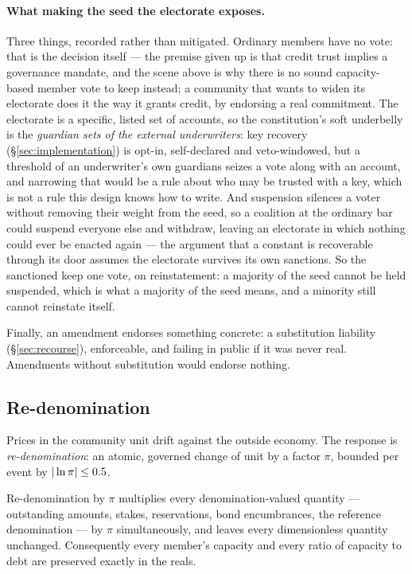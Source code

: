 \paragraph{What making the seed the electorate exposes.} Three things, recorded rather
than mitigated. Ordinary members have no vote: that is the decision itself --- the premise
given up is that credit trust implies a governance mandate, and the scene above is why
there is no sound capacity-based member vote to keep instead; a community that wants to
widen its electorate does it the way it grants credit, by endorsing a real commitment.
The electorate is a specific, listed set of accounts, so the constitution's soft underbelly
is the \emph{guardian sets of the external underwriters}: key recovery
(\S\ref{sec:implementation}) is opt-in, self-declared and veto-windowed, but a threshold
of an underwriter's own guardians seizes a vote along with an account, and narrowing that
would be a rule about who may be trusted with a key, which is not a rule this design knows
how to write. And suspension silences a voter without removing their weight from the
seed, so a coalition at the ordinary bar could suspend everyone else and withdraw, leaving
an electorate in which nothing could ever be enacted again --- the argument that a
constant is recoverable through its door assumes the electorate survives its own
sanctions. So the sanctioned keep one vote, on reinstatement: a majority of the seed cannot
be held suspended, which is what a majority of the seed means, and a minority still cannot
reinstate itself.

Finally, an amendment endorses something concrete: a substitution liability
(\S\ref{sec:recourse}), enforceable, and failing in public if it was never real.
Amendments without substitution would endorse nothing.

\subsection{Re-denomination}

Prices in the community unit drift against the outside economy. The response is
\emph{re-denomination}: an atomic, governed change of unit by a factor $\pi$, bounded per
event by $|\ln \pi| \le 0.5$.

\begin{theorem}
\label{thm:redenominate}
Re-denomination by $\pi$ multiplies every denomination-valued quantity --- outstanding
amounts, stakes, reservations, bond encumbrances, the reference denomination --- by $\pi$
simultaneously, and leaves every dimensionless quantity unchanged. Consequently every
member's capacity and every ratio of capacity to debt are preserved exactly in the reals.
\end{theorem}

